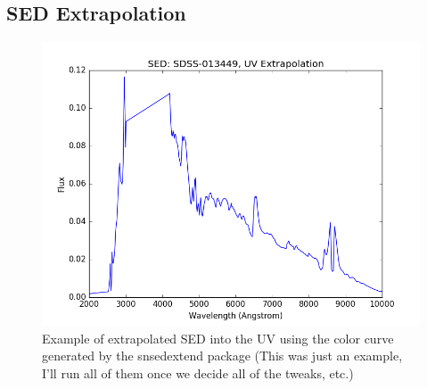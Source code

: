 \subsection{SED Extrapolation}
\begin{figure}[H]
\centering
\includegraphics[scale=.75,center]{FIG/seds/SED}
\caption{\label{fig:FIG/typeIb/J_fits} Example of extrapolated SED into the UV using the color curve generated by the snsedextend package (This was just an example, I'll run all of them once we decide all of the tweaks, etc.)}
\end{figure}
\bigskip
